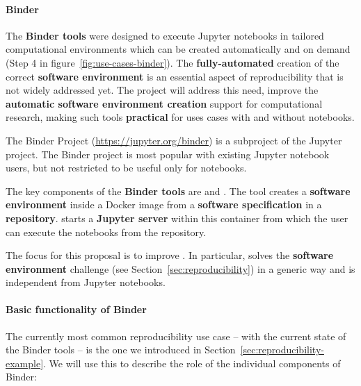 \paragraph*{Binder}\label{seq:project-binder}

The \textbf{Binder tools} were designed to execute
Jupyter notebooks in tailored computational environments which can be created
automatically and on demand (Step 4 in figure~\ref{fig:use-cases-binder}).
The \textbf{fully-automated} creation of the correct \textbf{software environment} is an
essential aspect of reproducibility that is not widely addressed yet.
The \TheProject{} project will address this need,
improve the \textbf{automatic software environment creation} support for computational research,
making such tools \textbf{practical} for uses cases with and without notebooks.

The Binder Project \cite{binder} (\url{https://jupyter.org/binder}) is
a subproject of the Jupyter project.
The Binder project is most popular with existing Jupyter notebook users,
but not restricted to be useful only for notebooks.

The key components of the \textbf{Binder tools} are \repotodocker{}
and \binderhub{}.
The \repotodocker{} tool creates a \textbf{software environment} inside a Docker image from a \textbf{software
specification} in a \textbf{repository}.
\binderhub{} starts a \textbf{Jupyter server}
within this container from which the user can execute the notebooks from the
repository.

The focus for this proposal is to improve \repotodocker{}. In particular,
\repotodocker{} solves the \textbf{software environment} challenge (see
Section~\ref{sec:reproducibility}) in a generic way and is independent
from Jupyter notebooks.


\paragraph*{Basic functionality of Binder}
\label{binder-how-does-it-work}

The currently most common reproducibility use case -- with the current state of the Binder
tools -- is the one we introduced in
Section~\ref{sec:reproducibility-example}. We will use this to
describe the role of the individual components of Binder:

